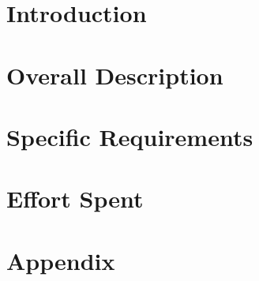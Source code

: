 \documentclass[a4paper,12pt]{report}
\begin{document}
\tableofcontents

\chapter{Introduction} \label{ch:Introduction}

\clearpage

\chapter{Overall Description}
%
\clearpage

\chapter{Specific Requirements}
%
\clearpage

\chapter{Effort Spent}

\clearpage

\appendix
\chapter{Appendix}


\end{document}
